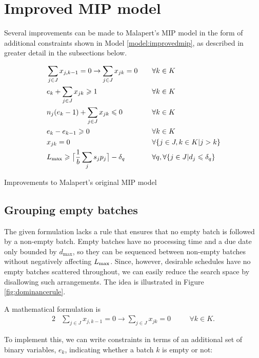\documentclass[13pt, letterpaper, oneside]{book}
\begin{document}
\section{Improved MIP model}\label{sec:improvedmipmodel}
Several improvements can be made to Malapert's MIP model in the form of
additional constraints shown in Model \ref{model:improvedmip}, as  
described in greater detail in the subsections below.

\begin{model}[h]
\begin{alignat}{2}
& \sum_{j \in J} x_{j,k-1} = 0 \rightarrow \sum_{j \in J} x_{jk} = 0 \quad &&
\forall k \in K \\
& e_k + \sum_{j \in J} x_{jk} \geqslant 1 \quad && \forall k \in K \\
& n_j (e_k-1) + \sum_{j \in J} x_{jk} \leqslant 0 \quad && \forall k \in K \\
& e_k - e_{k-1} \geqslant 0 \quad && \forall k \in K \\
& x_{jk} = 0 \quad && \forall \{j \in J, k \in K | j > k \} \\
& L_{\text{max}} \geqslant \big\lceil\frac{1}{b} \sum_{j} s_j
p_j\big\rceil - \delta_q \quad
&& \forall q, \forall \{ j \in J | d_j \leqslant \delta_q \}
\end{alignat}
\caption{Improvements to Malapert's original MIP model}
\label{model:improvedmip}
\end{model}

\subsection{Grouping empty batches} The given
formulation lacks a rule that ensures that no empty batch is followed by a
non-empty batch. Empty batches have no processing time and a due date only
bounded by $d_\text{max}$, so they can be sequenced between non-empty batches
without negatively affecting $L_{\text{max}}$. Since, however, desirable schedules have
no empty batches scattered throughout, we can easily reduce the search space by
disallowing such arrangements. The idea is illustrated in Figure
\ref{fig:dominancerule}.



A mathematical formulation is
\begin{alignat}{2}
& \sum_{j \in J} x_{j,k-1} = 0 \rightarrow \sum_{j \in J} x_{jk} = 0 \quad && \forall k \in K. \label{eq:emptybatch0}
\end{alignat}

To implement this, we can write constraints in terms of an additional  set of binary variables, $e_k$, indicating whether a batch $k$ is empty or not:
\end{document}
